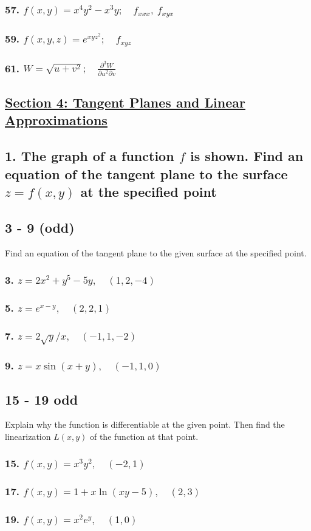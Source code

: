 \documentclass{article}
\begin{document}
\subsubsection*{57. $f(x,y) = x^4y^2 - x^3y;\quad f_{xxx},\: f_{xyx}$}
\subsubsection*{59. $f(x,y,z) = e^{xyz^2}; \quad f_{xyz}$}
\subsubsection*{61. $W = \sqrt{u + v^2}; \quad \displaystyle\frac{\partial^3 W}{\partial u^2 \partial v}$}
\newpage
\begin{center}
    \section*{\underline{Section 4: Tangent Planes and Linear Approximations}}
\end{center}
\subsection*{1. The graph of a function $f$ is shown. Find an equation of the tangent plane to the surface $z = f(x,y)$ at the specified point}
\subsection*{3 - 9 (odd)}
Find an equation of the tangent plane to the given surface at the specified point.
\subsubsection*{3. $z = 2x^2 + y^5 - 5y, \quad (1, 2, -4)$}
\subsubsection*{5. $z = e^{x-y},\quad (2,2,1)$}
\subsubsection*{7. $z = 2\sqrt y / x,\quad (-1,1,-2)$}
\subsubsection*{9. $z = x\sin (x+y),\quad (-1, 1, 0)$}
\subsection*{15 - 19 odd}
Explain why the function is differentiable at the given point. Then find the linearization $L(x,y)$ of the function at that point.
\subsubsection*{15. $f(x,y) = x^3y^2,\quad (-2,1)$}
\subsubsection*{17. $f(x,y) = 1 + x\ln (xy-5),\quad (2,3)$}
\subsubsection*{19. $f(x,y) = x^2e^y,\quad (1,0)$}
\end{document}
